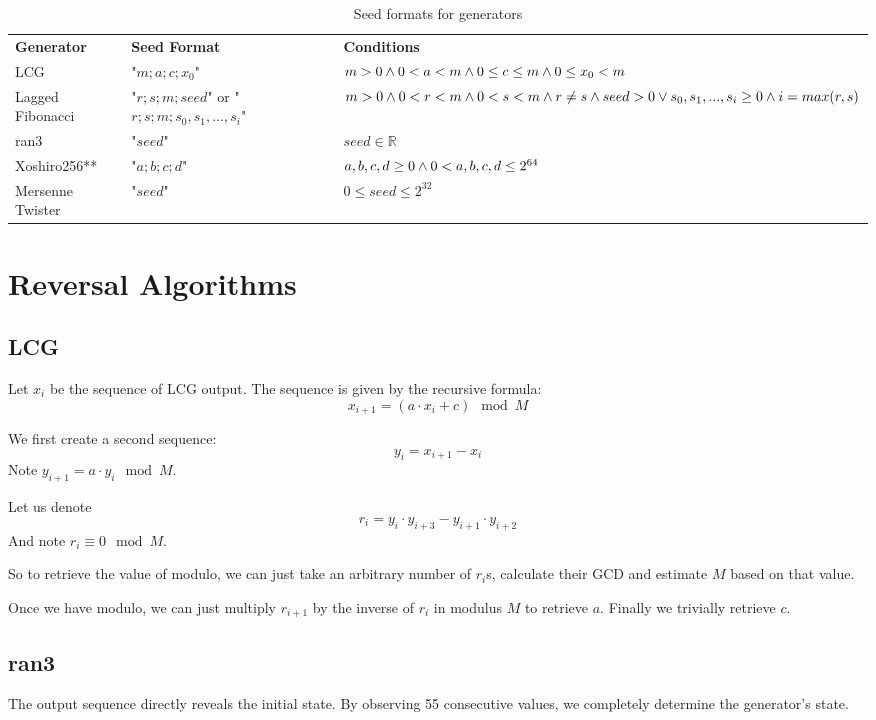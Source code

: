 \documentclass[12pt, a4paper]{report}
\begin{document}
\begin{table}
\begin{xltabular}{\textwidth}{| >{\raggedright\arraybackslash}X | >{\raggedright\arraybackslash}X | >{\raggedright\arraybackslash}X |}
	\caption{Seed formats for generators}
	\label{table:1}\\
	\hline
	\bf{Generator} & \bf{Seed Format} & \bf{Conditions} \\
	\hhline{|=|=|=|}
	LCG & 
	"$m;a;c;x_0$" & 
	$m > 0 \wedge\break 0 < a < m \wedge\break 0\leq c \leq m \wedge\break 0 \leq x_0 < m$\\
	\hline
	Lagged Fibonacci & 
	"$r;s;m;seed$" or \break "$r;s;m;s_0, s_1, ..., s_i$" & 
	$m > 0 \wedge\break 0 < r < m \wedge\break 0 < s < m \wedge\break r \neq s \wedge\break\break seed > 0 \vee\break
	s_0, s_1, ..., s_i \geq 0 \wedge\break i = max(r, s)$\\
	\hline
	ran3 &
	"$seed$" & 
  $seed \in \mathds{R}$\\
	\hline
	Xoshiro256** &
	"$a;b;c;d$" & 
	$a,b,c,d \ge 0 \wedge\break 0 < a,b,c,d \leq 2^{64}$ \\
	\hline
	Mersenne Twister&
	"$seed$" &
	$0 \leq seed \leq 2^{32}$ \\
	\hline
\end{xltabular}
\end{table}

\chapter{Reversal Algorithms}
\section{LCG}
Let $x_i$ be the sequence of LCG output. The sequence is given by the recursive formula:
$$x_{i+1} = (a \cdot x_i + c) \mod M$$

We first create a second sequence:
$$y_{i} = x_{i+1} - x_{i}$$ Note $y_{i+1} = a \cdot y_{i} \mod M$.

Let us denote $$r_i = y_{i} \cdot y_{i+3} - y_{i+1} \cdot y_{i+2}$$
And note $r_i \equiv 0 \mod M$.

So to retrieve the value of modulo, we can just take an arbitrary number of $r_i$s, calculate their GCD and estimate $M$ based on that value.

Once we have modulo, we can just multiply $r_{i+1}$ by the inverse of $r_{i}$ in modulus $M$ to retrieve $a$. Finally we trivially retrieve $c$.

\section{ran3}
The output sequence directly reveals the initial state. By observing 55 consecutive values, we completely determine the generator's state.
\end{document}
